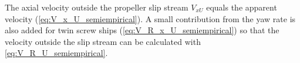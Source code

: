 The axial velocity outside the propeller slip stream $V_{xU}$ equals the apparent velocity (\autoref{eq:V_x_U_semiempirical}). A small contribution from the yaw rate is also added for twin screw ships (\autoref{eq:V_R_x_U_semiempirical}) so that the velocity outside the slip stream can be calculated with \autoref{eq:V_R_U_semiempirical}.
\begin{equation}
    \label{eq:V_x_U_semiempirical}
    
\end{equation}
%
\begin{equation}
    \label{eq:V_R_x_U_semiempirical}
    
\end{equation}
%
\begin{equation}
    \label{eq:V_R_U_semiempirical}
    
\end{equation}